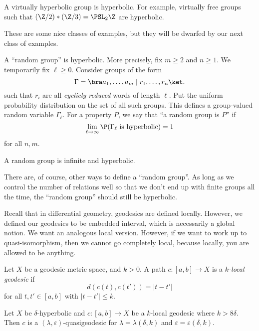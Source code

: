 \documentclass[a4paper]{article}
\begin{document}
\begin{eg}
  A virtually hyperbolic group is hyperbolic. For example, virtually free groups such that $(\Z/2) * (\Z/3) = \PSL_2\Z$ are hyperbolic.
\end{eg}

These are some nice classes of examples, but they will be dwarfed by our next class of examples.

A ``random group'' is hyperbolic. More precisely, fix $m \geq 2$ and $n \geq 1$. We temporarily fix $\ell \geq 0$. Consider groups of the form
\[
  \Gamma = \bra a_1, \ldots, a_m \mid r_1, \ldots, r_n\ket.
\]
such that $r_i$ are all \emph{cyclicly reduced} words of length $\ell$. Put the uniform probability distribution on the set of all such groups. This defines a group-valued random variable $\Gamma_\ell$. For a property $P$, we say that ``a random group is $P$'' if %
\[
  \lim_{\ell \to \infty}\P(\text{$\Gamma_\ell$ is hyperbolic}) = 1
\]
for all $n, m$.
\begin{thm}[Gromov]
  A random group is infinite and hyperbolic.
\end{thm}

There are, of course, other ways to define a ``random group''. As long as we control the number of relations well so that we don't end up with finite groups all the time, the ``random group'' should still be hyperbolic.

Recall that in differential geometry, geodesics are defined locally. However, we defined our geodesics to be embedded interval, which is necessarily a global notion. We want an analogous local version. However, if we want to work up to quasi-isomorphism, then we cannot go completely local, because locally, you are allowed to be anything.

\begin{defi}
  Let $X$ be a geodesic metric space, and $k > 0$. A path $c: [a, b] \to X$ is a \emph{$k$-local geodesic} if
  \[
    d(c(t), c(t')) = |t - t'|
  \]
  for all $t, t' \in [a, b]$ with $|t - t'| \leq k$.
\end{defi}

\begin{thm}
  Let $X$ be $\delta$-hyperbolic and $c: [a, b] \to X$ be a $k$-local geodesic where $k > 8 \delta$. Then $c$ is a $(\lambda, \varepsilon)$-quasigeodesic for $\lambda = \lambda(\delta, k)$ and $\varepsilon = \varepsilon(\delta, k)$.
\end{thm}
\end{document}
